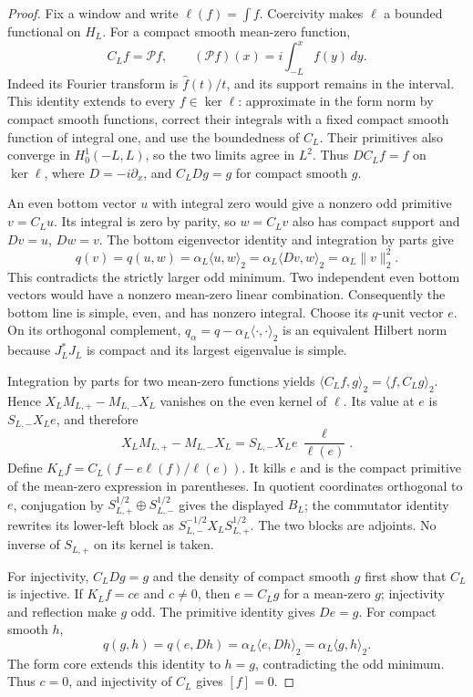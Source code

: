 \begin{proof}
Fix a window and write $\ell(f)=\int f$. Coercivity makes $\ell$ a
bounded functional on $H_L$. For a compact smooth mean-zero function,
\[
 C_Lf=\mathcal Pf,\qquad
 (\mathcal Pf)(x)=i\int_{-L}^x f(y)\,dy.
\]
Indeed its Fourier transform is $\widehat f(t)/t$, and its support
remains in the interval. This identity extends to every $f\in\ker\ell$:
approximate in the form norm by compact smooth functions, correct their
integrals with a fixed compact smooth function of integral one, and use
the boundedness of $C_L$. Their primitives also converge in
$H^1_0(-L,L)$, so the two limits agree in $L^2$.
Thus $DC_Lf=f$ on $\ker\ell$, where $D=-i\partial_x$, and
$C_LDg=g$ for compact smooth $g$.

An even bottom vector $u$ with integral zero would give a nonzero odd
primitive $v=C_Lu$. Its integral is zero by parity, so $w=C_Lv$ also
has compact support and $Dv=u$, $Dw=v$. The bottom eigenvector identity
and integration by parts give
\[
 q(v)=q(u,w)=\alpha_L\langle u,w\rangle_2
       =\alpha_L\langle Dv,w\rangle_2
       =\alpha_L\|v\|_2^2.
\]
This contradicts the strictly larger odd minimum. Two independent even
bottom vectors would have a nonzero mean-zero linear combination.
Consequently the bottom line is simple, even, and has nonzero integral.
Choose its $q$-unit vector $e$. On its orthogonal complement,
$q_\alpha=q-\alpha_L\langle\cdot,\cdot\rangle_2$ is an equivalent
Hilbert norm because $J_L^*J_L$ is compact and its largest eigenvalue
is simple.

Integration by parts for two mean-zero functions yields
$\langle C_Lf,g\rangle_2=\langle f,C_Lg\rangle_2$.
Hence $X_LM_{L,+}-M_{L,-}X_L$ vanishes on the even kernel of $\ell$.
Its value at $e$ is $S_{L,-}X_Le$, and therefore
\[
 X_LM_{L,+}-M_{L,-}X_L
   =S_{L,-}X_Le\,\frac{\ell}{\ell(e)}.
\]
Define $K_Lf=C_L(f-e\ell(f)/\ell(e))$. It kills $e$ and is the
compact primitive of the mean-zero expression in parentheses.
In quotient coordinates orthogonal to $e$, conjugation by
$S_{L,+}^{1/2}\oplus S_{L,-}^{1/2}$ gives the displayed $B_L$;
the commutator identity rewrites its lower-left block as
$S_{L,-}^{-1/2}X_LS_{L,+}^{1/2}$. The two blocks are adjoints.
No inverse of $S_{L,+}$ on its kernel is taken.

For injectivity, $C_LDg=g$ and the density of compact smooth $g$ first
show that $C_L$ is injective. If $K_Lf=ce$ and $c\ne0$, then
$e=C_Lg$ for a mean-zero $g$; injectivity and reflection make $g$ odd.
The primitive identity gives $De=g$. For compact smooth $h$,
\[
 q(g,h)=q(e,Dh)=\alpha_L\langle e,Dh\rangle_2
                   =\alpha_L\langle g,h\rangle_2.
\]
The form core extends this identity to $h=g$, contradicting the odd
minimum. Thus $c=0$, and injectivity of $C_L$ gives $[f]=0$.


\end{proof}

